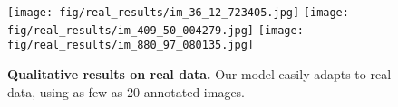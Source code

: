 
\begin{figure}[t]
\centering
\texttt{[image: fig/real\_results/im\_36\_12\_723405.jpg]}
\texttt{[image: fig/real\_results/im\_409\_50\_004279.jpg]}
\texttt{[image: fig/real\_results/im\_880\_97\_080135.jpg]}
\vspace{-3mm}
\caption{\small {\bf Qualitative results on real data.} Our model easily adapts to real data, using as few as 20 annotated images.
}
\label{fig:domain_adaptation}
\end{figure}